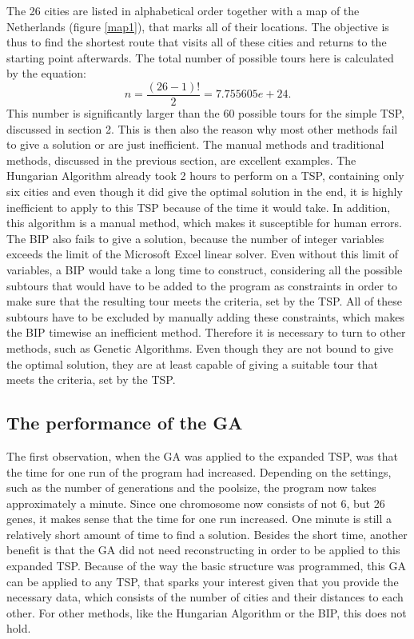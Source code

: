 \noindent The 26 cities are listed in alphabetical order together with a map of the Netherlands (figure \ref{map1}), that marks all of their locations. The objective is thus to find the shortest route that visits all of these cities and returns to the starting point afterwards. The total number of possible tours here is calculated by the equation: %
\[n = \frac{(26-1)!}{2} =  7.755605e+24.\]
This number is significantly larger than the 60 possible tours for the simple TSP, discussed in section 2. This is then also the reason why most other methods fail to give a solution or are just inefficient. The manual methods and traditional methods, discussed in the previous section, are excellent examples. The Hungarian Algorithm already took 2 hours to perform on a TSP, containing only six cities and even though it did give the optimal solution in the end, it is highly inefficient to apply to this TSP because of the time it would take. In addition, this algorithm is a manual method, which makes it susceptible for human errors. The BIP also fails to give a solution, because the number of integer variables exceeds the limit of the Microsoft Excel linear solver. Even without this limit of variables, a BIP would take a long time to construct, considering all the possible subtours that would have to be added to the program as constraints in order to make sure that the resulting tour meets the criteria, set by the TSP. All of these subtours have to be excluded by manually adding these constraints, which makes the BIP timewise an inefficient method. Therefore it is necessary to turn to other methods, such as Genetic Algorithms. Even though they are not bound to give the optimal solution, they are at least capable of giving a suitable tour that meets the criteria, set by the TSP.

\subsection{The performance of the GA} \label{perf}%
\par
The first observation, when the GA was applied to the expanded TSP, was that the time for one run of the program had increased. Depending on the settings, such as the number of generations and the poolsize, the program now takes approximately a minute. Since one chromosome now consists of not 6, but 26 genes, it makes sense that the time for one run increased. One minute is still a relatively short amount of time to find a solution. Besides the short time, another benefit is that the GA did not need reconstructing in order to be applied to this expanded TSP. Because of the way the basic structure was programmed, this GA can be applied to any TSP, that sparks your interest given that you provide the necessary data, which consists of the number of cities and their distances to each other. For other methods, like the Hungarian Algorithm or the BIP, this does not hold. 

